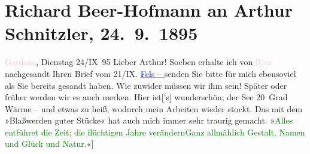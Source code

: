 

               \section[Richard Beer-Hofmann an Arthur Schnitzler, 24. 9. 1895]{ Richard Beer-Hofmann an Arthur Schnitzler, 24. 9. 1895}\nopagebreak{}\rehead{ }\normalsize\beginnumbering{} \toendnotes[C]{\smallbreak\pagebreak[2]} 
\toendnotes[C]{\smallbreak}\pstart
           \raggedleft{}{\pb}\textcolor{pink}{Gardone}{}\ledrightnote{\textcolor{pink}{Gardone Riviera}}, Dienstag 24/IX 95\pend
           \pstart
           Lieber Arthur! Soeben erhalte ich von \textcolor{pink}{Riva}{}\ledrightnote{\textcolor{pink}{Riva del Garda}} nachgesandt Ihren Brief vom 21/IX. \uline{\textcolor{blue}{Fels}{}\ledrightnote{\textcolor{blue}{Friedrich Michael Fels}} – \label{K_L00492_1v}\label{K_L00492_1h}} senden Sie bitte für mich ebensoviel als Sie bereits gesandt haben. Wie zuwider
               müssen wir ihm sein! Später oder früher werden wir es auch merken.\pend
           \pstart
           Hier ist{[}’s{]} wunderschön; der See 20 Grad Wärme – und etwas zu
               heiß, wodurch mein Arbeiten wieder stockt.\pend
           \pstart
           {\pb}Das mit dem »Blaßwerden guter
               Stücke« hat auch mich immer sehr traurig gemacht.\pend
           \stanza{}»\textcolor{green}{Alles entführet die Zeit; die
                     flüchtigen Jahre verändern}{}\newverse{}\textcolor{green}{Ganz allmählich Gestalt, Namen und
                     Glück und Natur.}{}\ledrightnote{→\textcolor{green}{Epigramme}}{[}«{]}\stanzaend{}\pstart
